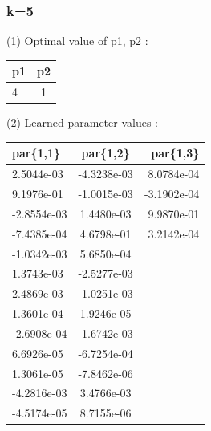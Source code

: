 \documentclass{article}
\begin{document}
\subsubsection*{k=5}
(1) Optimal value of p1, p2 :  \\
\begin{center}
	\begin{tabular}{ l | c }
		\hline
		p1 & p2 \\ \hline		
		4 & 1 \\ \hline
	\end{tabular}
\end{center}
(2) Learned parameter values : \\
\begin{center}
	\begin{tabular}{ l | c | r  }
		\hline
		par\{1,1\}& par\{1,2\} & par\{1,3\} \\
		\hline		
		2.5044e-03 & -4.3238e-03 & 8.0784e-04 \\ \hline
		9.1976e-01 & -1.0015e-03 & -3.1902e-04 \\ \hline
		-2.8554e-03 & 1.4480e-03 & 9.9870e-01 \\ \hline
		-7.4385e-04 & 4.6798e-01 & 3.2142e-04 \\ \hline
		-1.0342e-03 & 5.6850e-04 &  \\ \hline
		1.3743e-03 & -2.5277e-03 &  \\ \hline
		2.4869e-03 & -1.0251e-03 &  \\ \hline
		1.3601e-04 & 1.9246e-05 &  \\ \hline
		-2.6908e-04 & -1.6742e-03 &  \\ \hline
		6.6926e-05 & -6.7254e-04 &  \\ \hline
		1.3061e-05 & -7.8462e-06 &  \\ \hline
		-4.2816e-03 & 3.4766e-03 &  \\ \hline
		-4.5174e-05 & 8.7155e-06 &  \\ \hline
	\end{tabular}
\end{center}

\newpage
\end{document}
